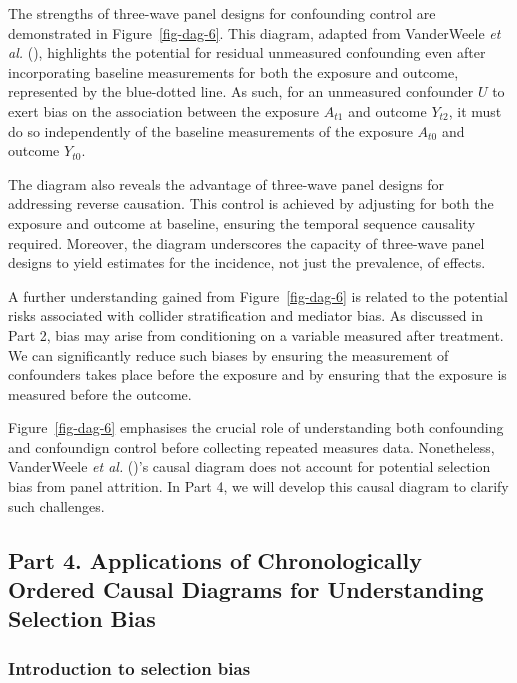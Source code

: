 \documentclass[
  singlecolumn]{article}
\begin{document}
The strengths of three-wave panel designs for confounding control are
demonstrated in Figure~\ref{fig-dag-6}. This diagram, adapted from
VanderWeele \emph{et al.} (),
highlights the potential for residual unmeasured confounding even after
incorporating baseline measurements for both the exposure and outcome,
represented by the blue-dotted line. As such, for an unmeasured
confounder \(U\) to exert bias on the association between the exposure
\(A_{t1}\) and outcome \(Y_{t2}\), it must do so independently of the
baseline measurements of the exposure \(A_{t0}\) and outcome \(Y_{t0}\).

The diagram also reveals the advantage of three-wave panel designs for
addressing reverse causation. This control is achieved by adjusting for
both the exposure and outcome at baseline, ensuring the temporal
sequence causality required. Moreover, the diagram underscores the
capacity of three-wave panel designs to yield estimates for the
incidence, not just the prevalence, of effects.

A further understanding gained from Figure~\ref{fig-dag-6} is related to
the potential risks associated with collider stratification and mediator
bias. As discussed in Part 2, bias may arise from conditioning on a
variable measured after treatment. We can significantly reduce such
biases by ensuring the measurement of confounders takes place before the
exposure and by ensuring that the exposure is measured before the
outcome.

Figure~\ref{fig-dag-6} emphasises the crucial role of understanding both
confounding and confoundign control before collecting repeated measures
data. Nonetheless, VanderWeele \emph{et al.}
()'s causal diagram does not account
for potential selection bias from panel attrition. In Part 4, we will
develop this causal diagram to clarify such challenges.

\subsection{Part 4. Applications of Chronologically Ordered Causal
Diagrams for Understanding Selection
Bias}\label{part-4.-applications-of-chronologically-ordered-causal-diagrams-for-understanding-selection-bias}

\subsubsection{Introduction to selection
bias}\label{introduction-to-selection-bias}
\end{document}
